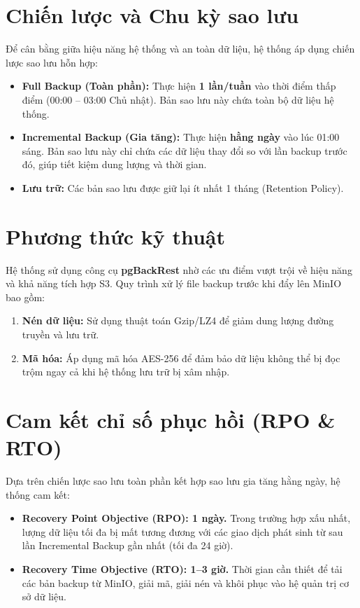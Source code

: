 \section{Chiến lược và Chu kỳ sao lưu}

Để cân bằng giữa hiệu năng hệ thống và an toàn dữ liệu, hệ thống áp dụng chiến lược sao lưu hỗn hợp:

\begin{itemize}
    \item \textbf{Full Backup (Toàn phần):} Thực hiện \textbf{1 lần/tuần} vào thời điểm thấp điểm (00:00 – 03:00 Chủ nhật). Bản sao lưu này chứa toàn bộ dữ liệu hệ thống.
    \item \textbf{Incremental Backup (Gia tăng):} Thực hiện \textbf{hằng ngày} vào lúc 01:00 sáng. Bản sao lưu này chỉ chứa các dữ liệu thay đổi so với lần backup trước đó, giúp tiết kiệm dung lượng và thời gian.
    \item \textbf{Lưu trữ:} Các bản sao lưu được giữ lại ít nhất 1 tháng (Retention Policy).
\end{itemize}

\section{Phương thức kỹ thuật}

Hệ thống sử dụng công cụ \textbf{pgBackRest} nhờ các ưu điểm vượt trội về hiệu năng và khả năng tích hợp S3. Quy trình xử lý file backup trước khi đẩy lên MinIO bao gồm:
\begin{enumerate}
    \item \textbf{Nén dữ liệu:} Sử dụng thuật toán Gzip/LZ4 để giảm dung lượng đường truyền và lưu trữ.
    \item \textbf{Mã hóa:} Áp dụng mã hóa AES-256 để đảm bảo dữ liệu không thể bị đọc trộm ngay cả khi hệ thống lưu trữ bị xâm nhập.
\end{enumerate}

\section{Cam kết chỉ số phục hồi (RPO \& RTO)}

Dựa trên chiến lược sao lưu toàn phần kết hợp sao lưu gia tăng hằng ngày, hệ thống cam kết:

\begin{itemize}
    \item \textbf{Recovery Point Objective (RPO): 1 ngày.}
    Trong trường hợp xấu nhất, lượng dữ liệu tối đa bị mất tương đương với các giao dịch phát sinh từ sau lần Incremental Backup gần nhất (tối đa 24 giờ).
    
    \item \textbf{Recovery Time Objective (RTO): 1–3 giờ.}
    Thời gian cần thiết để tải các bản backup từ MinIO, giải mã, giải nén và khôi phục vào hệ quản trị cơ sở dữ liệu.
\end{itemize}